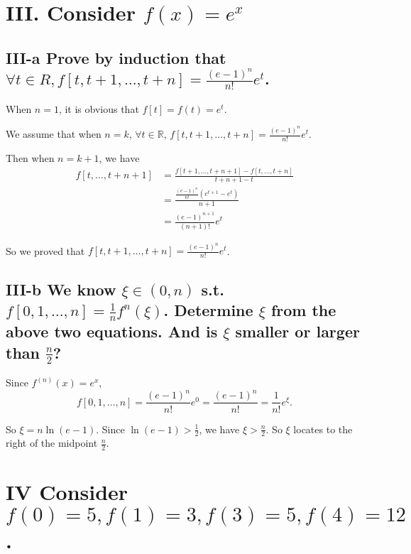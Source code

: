 \documentclass[twoside,a4paper]{article}
\begin{document}
\section*{III. \small{Consider $f\left( x \right)=e^{x} $}}

\subsection*{III-a \small{Prove by induction that $\forall t\in R,
f[t,t+1,\ldots,t+n]=\frac{\left(  e-1\right)^{n} }{n!}e^{t}$.}}

When $n=1$, it is obvious that  $f[t]=f\left( t \right)=e^{t} $.

We assume that when $n=k$,  $\forall t\in\mathbb{R}$, $f[t,t+1,\ldots,t+n]=\frac{\left( e-1 \right)^{n} }{n!}e^{t}$.

Then when $n=k+1$, we have
\begin{equation*}
\begin{split}
	f[t,\ldots,t+n+1] &=\frac{f[t+1,\ldots,t+n+1]-f[t,\ldots,t+n]}{t+n+1-t}
		       \\ &= \frac{\frac{\left( e-1 \right)^{n} }{n!}\left( e^{t+1}-e^{t} \right) }{n+1}
			\\&=\frac{\left( e-1 \right)^{n+1} }{\left( n+1 \right)! }e^{t}
 \end{split}
 \end{equation*}
 
 So we proved that 
$f[t,t+1,\ldots,t+n]=\frac{\left(  e-1\right)^{n} }{n!}e^{t}$.

\subsection*{III-b \small{We know 
		$\xi\in\left( 0,n \right) $ s.t. $f[0,1,\ldots,n]=\frac{1}{n}f^{n}\left( \xi \right) $.
Determine $\xi$ from the above two equations. And is $\xi$ smaller or larger than  $\frac{n}{2}$?}}

Since $f^{\left( n \right) }\left( x \right)=e^{x} $,
\[
	f[0,1,\ldots,n]=\frac{\left( e-1 \right)^{n} }{n!}e^{0}=\frac{\left( e-1 \right)^{n} }{n!}=\frac{1}{n!}e^{\xi}
.\] 

So $\xi=n\ln\left( e-1 \right) $. Since $\ln\left( e-1 \right)>\frac{1}{2} $, we have $\xi>\frac{n}{2}$. 
So $\xi$ locates to the right of the midpoint $\frac{n}{2}$.

\section*{IV \small{Consider $f\left( 0 \right)=5,
f\left(  1\right)=3, f\left(  3\right)=5,f\left( 4 \right)=12  $.}}
\end{document}
